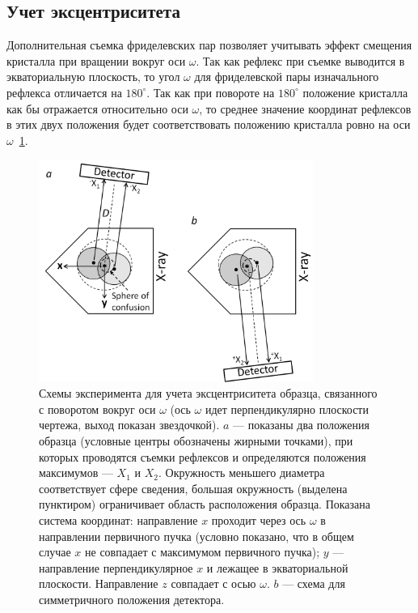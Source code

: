 \documentclass[a4paper,14pt]{extarticle}
\newcommand{\degree}{^\circ}
\begin{document}
\subsection{Учет эксцентриситета}
Дополнительная съемка фриделевских пар позволяет учитывать эффект смещения кристалла при вращении вокруг оси $\omega$.
Так как рефлекс при съемке выводится в экваториальную плоскость, то угол $\omega$ для фриделевской пары изначального рефлекса отличается на $180\degree$.
Так как при повороте на $180\degree$ положение кристалла как бы отражается относительно оси $\omega$, то среднее значение координат рефлексов в этих двух положения будет соответствовать положению кристалла ровно на оси $\omega$~\ref{fig:eccentr}.

\begin{figure}[ht!]
    \centering
    \includegraphics[width=0.8\textwidth]{eccentr.png}
    \caption{Схемы эксперимента для учета эксцентриситета образца, связанного с поворотом вокруг оси $\omega$ (ось $\omega$ идет перпендикулярно плоскости чертежа, выход показан звездочкой). $a$ --- показаны два положения образца (условные центры обозначены жирными точками), при которых проводятся съемки рефлексов и определяются положения максимумов –-- $X_1$ и $X_2$. Окружность меньшего диаметра соответствует сфере сведения, большая окружность (выделена пунктиром) ограничивает область расположения образца. Показана система координат: направление $x$ проходит через ось $\omega$ в направлении первичного пучка (условно показано, что в общем случае $x$ не совпадает с максимумом первичного пучка); $y$ --– направление перпендикулярное $x$ и лежащее в экваториальной плоскости. Направление $z$ совпадает с осью $\omega$. $b$ –-- схема для симметричного положения детектора.}
    \label{fig:eccentr}
\end{figure}
\end{document}
